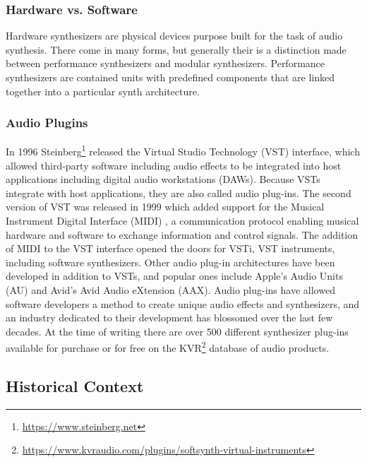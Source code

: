 \subsubsection{Hardware vs. Software}
Hardware synthesizers are physical devices purpose built for the task of audio synthesis. There come in many forms, but generally their is a distinction made between performance synthesizers and modular synthesizers. Performance synthesizers are contained units with predefined components that are linked together into a particular synth architecture.

\subsubsection{Audio Plugins}
In 1996 Steinberg\footnote{\url{https://www.steinberg.net}} released the Virtual Studio Technology (VST) interface, which allowed third-party software including audio effects to be integrated into host applications including digital audio workstations (DAWs). Because VSTs integrate with host applications, they are also called audio plug-ins. The second version of VST was released in 1999 which added support for the Musical Instrument Digital Interface (MIDI) \cite{rothstein1992midi}, a communication protocol enabling musical hardware and software to exchange information and control signals. The addition of MIDI to the VST interface opened the doors for VSTi, VST instruments, including software synthesizers. Other audio plug-in architectures have been developed in addition to VSTs, and popular ones include Apple's Audio Units (AU) and Avid's Avid Audio eXtension (AAX). Audio plug-ins have allowed software developers a method to create unique audio effects and synthesizers, and an industry dedicated to their development has blossomed over the last few decades. At the time of writing there are over 500 different synthesizer plug-ins available for purchase or for free on the KVR\footnote{\url{https://www.kvraudio.com/plugins/softsynth-virtual-instruments}} database of audio products.

\subsection{Historical Context}


